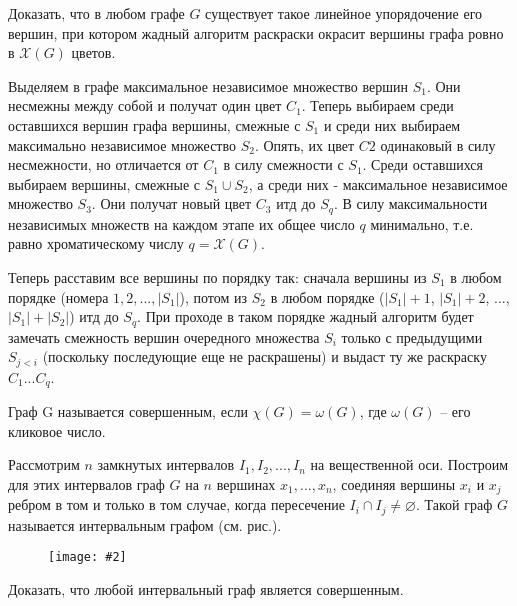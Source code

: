 \documentclass[a4paper,12pt]{article}
\numberwithin{figure}{section}
\def\CHI{\mathcal{X}}
\newcommand\CenterFigure[2]{\begin{figure}[H]\centering\texttt{[image: \#2]}\end{figure}}
\begin{document}
\begin{problem}
	Доказать, что в любом графе $G$ существует такое линейное упорядочение его вершин, при котором жадный алгоритм раскраски окрасит вершины графа ровно в $\CHI(G)$ цветов.
\end{problem}
\begin{solution}
	Выделяем в графе максимальное независимое множество вершин $S_1$. Они несмежны между собой и получат один цвет $C_1$. Теперь выбираем среди оставшихся вершин графа вершины, смежные с $S_1$ и среди них выбираем максимально независимое множество $S_2$. Опять, их цвет $C2$ одинаковый в силу несмежности, но отличается от $C_1$ в силу смежности с $S_1$. Среди оставшихся выбираем вершины, смежные с $S_1 \cup S_2$, а среди них - максимальное независимое множество $S_3$. Они получат новый цвет $C_3$ итд до $S_q$. В силу максимальности независимых множеств на каждом этапе их общее число $q$ минимально, т.е. равно хроматическому числу $q = \CHI(G)$.
	
	Теперь расставим все вершины по порядку так: сначала вершины из $S_1$ в любом порядке (номера $1,2,...,|S_1|$), потом из $S_2$ в любом порядке ($|S_1|+1$, $|S_1|+2$, ..., $|S_1|+|S_2|$) итд до $S_q$. При проходе в таком порядке жадный алгоритм будет замечать смежность вершин очередного множества $S_i$ только с предыдущими $S_{j<i}$ (поскольку последующие еще не раскрашены) и выдаст ту же раскраску $C_1...C_q$.
\end{solution}



\begin{problem}

	Граф G называется совершенным, если $\chi(G)=\omega(G)$, где $\omega(G)$ -- его кликовое число.

	Рассмотрим $n$ замкнутых интервалов $I_1,I_2,...,I_n$ на вещественной оси. Построим для этих интервалов граф $G$ на $n$ вершинах $x_1,...,x_n$, соединяя вершины $x_i$ и $x_j$ ребром в том и только в том случае, когда пересечение $I_i \cap I_j \neq \varnothing$. Такой граф $G$ называется интервальным графом (см. рис.). 
		\CenterFigure{8cm}{interval-graph-coloring.png}
	Доказать, что любой интервальный граф является совершенным.
\end{problem}
\end{document}
